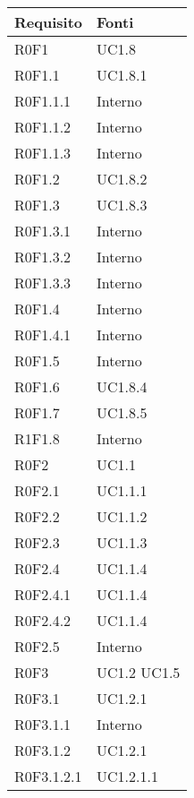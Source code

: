 	\begin{center}

	\def\arraystretch{1.5}
	\bgroup
	\begin{longtable}{| p{4cm} | p{4cm} |}

		\hline
		\textbf{Requisito} & \textbf{Fonti} \\
		\hline


		R0F1  & UC1.8 \\
		\hline
		R0F1.1  &  UC1.8.1 \\
		\hline
		R0F1.1.1  &  Interno \\
		\hline
		R0F1.1.2  &  Interno \\
		\hline
		R0F1.1.3  &  Interno \\
		\hline
		R0F1.2  &  UC1.8.2 \\
		\hline
		R0F1.3  &  UC1.8.3 \\
		\hline
		R0F1.3.1  &  Interno \\
		\hline
		R0F1.3.2  &  Interno \\
		\hline
		R0F1.3.3  &  Interno \\
		\hline
		R0F1.4  &  Interno \\
		\hline
		R0F1.4.1  &  Interno \\
		\hline
		R0F1.5  &  Interno \\
		\hline
		R0F1.6  &  UC1.8.4 \\
		\hline
		R0F1.7  &  UC1.8.5 \\
		\hline
		R1F1.8  &  Interno \\
		\hline
		R0F2  &  UC1.1 \\
		\hline
		R0F2.1  &  UC1.1.1 \\
		\hline
		R0F2.2  &  UC1.1.2 \\
		\hline
		R0F2.3  &  UC1.1.3 \\
		\hline
		R0F2.4  &  UC1.1.4 \\
		\hline
		R0F2.4.1  &  UC1.1.4 \\
		\hline
		R0F2.4.2  &  UC1.1.4 \\
		\hline
		R0F2.5  &  Interno  \\
		\hline
		R0F3  &  UC1.2 \newline UC1.5 \\
		\hline
		R0F3.1  &  UC1.2.1 \\
		\hline
		R0F3.1.1  &  Interno \\
		\hline
		R0F3.1.2  &  UC1.2.1 \\
		\hline
		R0F3.1.2.1  &  UC1.2.1.1 \\

\end{longtable}
\end{center}
